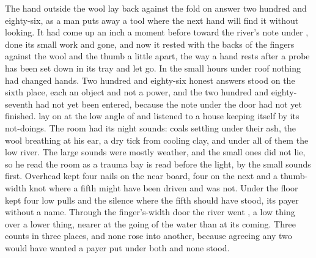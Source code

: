 
The hand outside the wool lay back against the fold on answer two hundred and eighty-six, as a man puts away a tool where the next hand will find it without looking. It had come up an inch a moment before toward the river's note under , done its small work and gone, and now it rested with the backs of the fingers against the wool and the thumb a little apart, the way a hand rests after a probe has been set down in its tray and let go. In the small hours under  roof nothing had changed hands. Two hundred and eighty-six honest answers stood on the sixth place, each an object and not a power, and the two hundred and eighty-seventh had not yet been entered, because the note under the door had not yet finished.  lay on  at the low angle of  and listened to a house keeping itself by its not-doings. The room had its night sounds: coals settling under their ash, the wool breathing at his ear, a dry tick from cooling clay, and under all of them the low river. The large sounds were mostly weather, and the small ones did not lie, so he read the room as a trauma bay is read before the light, by the small sounds first. Overhead  kept four nails on the near board, four on the next and a thumb-width knot where a fifth might have been driven and was not. Under the floor  kept four low pulls and the silence where the fifth should have stood, its payer without a name. Through the finger's-width door the river went , a low thing over a lower thing, nearer at the going of the water than at its coming. Three counts in three places, and none rose into another, because agreeing any two would have wanted a payer put under both and none stood.

